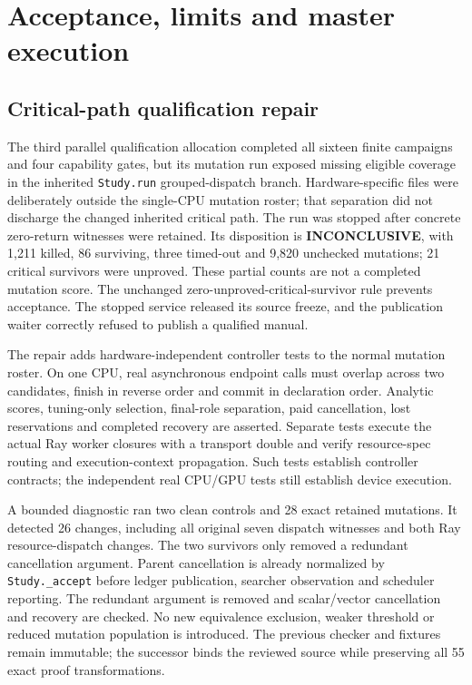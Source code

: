 \section{Acceptance, limits and master execution}
\subsection{Critical-path qualification repair}
The third parallel qualification allocation completed all sixteen finite
campaigns and four capability gates, but its mutation run exposed missing
eligible coverage in the inherited \texttt{Study.run} grouped-dispatch branch.
Hardware-specific files were deliberately outside the single-CPU mutation
roster; that separation did not discharge the changed inherited critical path.
The run was stopped after concrete zero-return witnesses were retained. Its
disposition is \textbf{INCONCLUSIVE}, with 1,211 killed, 86 surviving, three
timed-out and 9,820 unchecked mutations; 21 critical survivors were unproved.
These partial counts are not a completed mutation score. The unchanged
zero-unproved-critical-survivor rule prevents acceptance. The stopped service
released its source freeze, and the publication waiter correctly refused to
publish a qualified manual.

The repair adds hardware-independent controller tests to the normal mutation
roster. On one CPU, real asynchronous endpoint calls must overlap across two
candidates, finish in reverse order and commit in declaration order. Analytic
scores, tuning-only selection, final-role separation, paid cancellation, lost
reservations and completed recovery are asserted. Separate tests execute the
actual Ray worker closures with a transport double and verify resource-spec
routing and execution-context propagation. Such tests establish controller
contracts; the independent real CPU/GPU tests still establish device execution.

A bounded diagnostic ran two clean controls and 28 exact retained mutations.
It detected 26 changes, including all original seven dispatch witnesses and
both Ray resource-dispatch changes. The two survivors only removed a redundant
cancellation argument. Parent cancellation is already normalized by
\texttt{Study.\_accept} before ledger publication, searcher observation and
scheduler reporting. The redundant argument is removed and scalar/vector
cancellation and recovery are checked. No new equivalence exclusion, weaker
threshold or reduced mutation population is introduced. The previous checker
and fixtures remain immutable; the successor binds the reviewed source while
preserving all 55 exact proof transformations.

